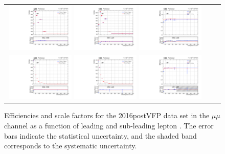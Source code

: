 \begin{figure}[h]
  \begin{center}
    \begin{tabular}{ccc}
      \includegraphics[width=0.32\textwidth]{fig_2016postVFP_TrigSF/g_lepApt_mumu_MC.pdf}
      \includegraphics[width=0.32\textwidth]{fig_2016postVFP_TrigSF/g_lepApt_mumu_data.pdf}
      \includegraphics[width=0.32\textwidth]{fig_2016postVFP_TrigSF/g_mumu_lepApt_FullSystUncBand.pdf}\\
      \includegraphics[width=0.32\textwidth]{fig_2016postVFP_TrigSF/g_lepBpt_mumu_MC.pdf}
      \includegraphics[width=0.32\textwidth]{fig_2016postVFP_TrigSF/g_lepBpt_mumu_data.pdf}
      \includegraphics[width=0.32\textwidth]{fig_2016postVFP_TrigSF/g_mumu_lepBpt_FullSystUncBand.pdf}\\
    \end{tabular}
    \caption{Efficiencies and scale factors for the 2016postVFP data set in the $\mu\mu$ channel as a function of leading and sub-leading lepton \pT.
            The error bars indicate the statistical uncertainty, and the shaded band corresponds to the systematic uncertainty.
            }
    \label{TrigSF_2016postVFP_3}
  \end{center}
\end{figure}

